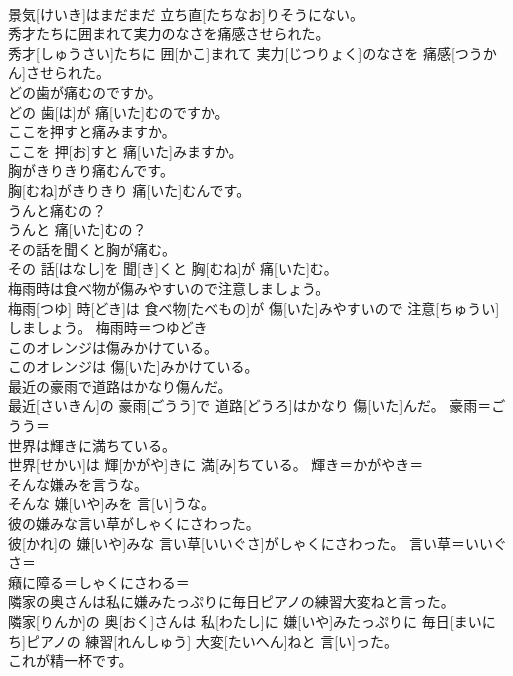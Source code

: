 \documentclass[8pt]{extreport}
\begin{document}
\begin{CJK}{UTF8}{min}
{\\	景気[けいき]はまだまだ 立ち直[たちなお]りそうにない。	
\\	秀才たちに囲まれて実力のなさを痛感させられた。	
\\	秀才[しゅうさい]たちに 囲[かこ]まれて 実力[じつりょく]のなさを 痛感[つうかん]させられた。	
\\	どの歯が痛むのですか。	
\\	どの 歯[は]が 痛[いた]むのですか。	
\\	ここを押すと痛みますか。	
\\	ここを 押[お]すと 痛[いた]みますか。	
\\	胸がきりきり痛むんです。	
\\	胸[むね]がきりきり 痛[いた]むんです。	
\\	うんと痛むの？	
\\	うんと 痛[いた]むの？	
\\	その話を聞くと胸が痛む。	
\\	その 話[はなし]を 聞[き]くと 胸[むね]が 痛[いた]む。	
\\	梅雨時は食べ物が傷みやすいので注意しましょう。	
\\	梅雨[つゆ] 時[どき]は 食べ物[たべもの]が 傷[いた]みやすいので 注意[ちゅうい]しましょう。	梅雨時＝つゆどき
\\	このオレンジは傷みかけている。	
\\	このオレンジは 傷[いた]みかけている。	
\\	最近の豪雨で道路はかなり傷んだ。	
\\	最近[さいきん]の 豪雨[ごうう]で 道路[どうろ]はかなり 傷[いた]んだ。	豪雨＝ごうう＝ 
\\	世界は輝きに満ちている。	
\\	世界[せかい]は 輝[かがや]きに 満[み]ちている。	輝き＝かがやき＝ 
\\	そんな嫌みを言うな。	
\\	そんな 嫌[いや]みを 言[い]うな。	
\\	彼の嫌みな言い草がしゃくにさわった。	
\\	彼[かれ]の 嫌[いや]みな 言い草[いいぐさ]がしゃくにさわった。	言い草＝いいぐさ＝ 
\\	癪に障る＝しゃくにさわる＝ 
\\	隣家の奥さんは私に嫌みたっぷりに毎日ピアノの練習大変ねと言った。	
\\	隣家[りんか]の 奥[おく]さんは 私[わたし]に 嫌[いや]みたっぷりに 毎日[まいにち]ピアノの 練習[れんしゅう] 大変[たいへん]ねと 言[い]った。	
\\	これが精一杯です。	
}
\end{CJK}
\end{document}
